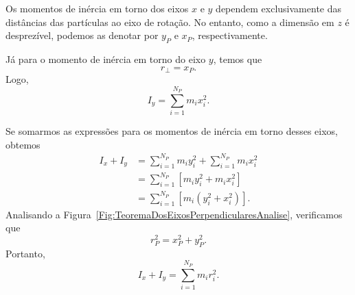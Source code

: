 \begin{marginfigure}
\centering
{}
\caption{Os momentos de inércia em torno dos eixos $x$ e $y$ dependem exclusivamente das distâncias das partículas ao eixo de rotação. No entanto, como a dimensão em $z$ é desprezível, podemos as denotar por $y_P$ e $x_P$, respectivamente. \label{Fig:TeoremaDosEixosPerpendicularesAnalise}}
\end{marginfigure}

Já para o momento de inércia em torno do eixo $y$, temos que
\begin{equation}
    r_\perp = x_P.
\end{equation}
%
Logo,
\begin{equation}
    I_y = \sum_{i = 1}^{N_P} m_i x_i^2.
\end{equation}

Se somarmos as expressões para os momentos de inércia em torno desses eixos, obtemos
\begin{align}
    I_x + I_y &= \sum_{i = 1}^{N_P} m_i y_i^2 + \sum_{i = 1}^{N_P} m_i x_i^2 \\
    &= \sum_{i = 1}^{N_P} \left[ m_i y_i^2 + m_i x_i^2\right] \\
    &= \sum_{i = 1}^{N_P} \left[ m_i (y_i^2 + x_i^2)\right].
\end{align}
%
Analisando a Figura~\ref{Fig:TeoremaDosEixosPerpendicularesAnalise}, verificamos que
\begin{equation}
    r_P^2 = x_P^2 + y_P^2.
\end{equation}
%
Portanto,
\begin{equation}
    I_x + I_y = \sum_{i = 1}^{N_P} m_i r_i^2.
\end{equation}

